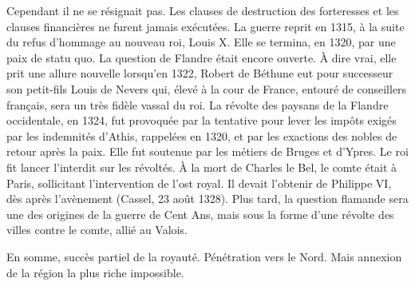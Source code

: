\documentclass[french,twoside]{book} %
\begin{document}
\label{p26} Cependant il ne se résignait pas. Les clauses de destruction des forteresses et les clauses financières ne furent jamais exécutées. La guerre reprit en 1315, à la suite du refus d’hommage au nouveau roi, Louis X. Elle se termina, en 1320, par une paix de statu quo. La question de Flandre était encore ouverte. À dire vrai, elle prit une allure nouvelle lorsqu’en 1322, Robert de Béthune eut pour successeur son petit-fils Louis de Nevers qui, élevé à la cour de France, entouré de conseillers français, sera un très fidèle vassal du roi. La révolte des paysans de la Flandre occidentale, en 1324, fut provoquée par la tentative pour lever les impôts exigés par les indemnités d’Athis, rappelées en 1320, et par les exactions des nobles de retour après la paix. Elle fut soutenue par les métiers de Bruges et d’Ypres. Le roi fit lancer l’interdit sur les révoltés. À la mort de Charles le Bel, le comte était à Paris, sollicitant l’intervention de l’ost royal. Il devait l’obtenir de Philippe VI, dès après l’avènement (Cassel, 23 août 1328). Plus tard, la question flamande sera une des origines de la guerre de Cent Ans, mais sous la forme d’une révolte des villes contre le comte, allié au Valois.\par
En somme, succès partiel de la royauté. Pénétration vers le Nord. Mais annexion de la région la plus riche impossible.
\end{document}
